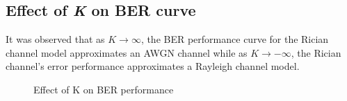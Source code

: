 \subsection{Effect of \emph{K} on BER curve}
It was observed that as \(K \to \infty\), the BER performance curve for the Rician channel model approximates an AWGN channel while as \(K \to -\infty\), the Rician channel's error performance approximates a Rayleigh channel model.
\begin{figure}[!h]
	\centerline{}
	\caption{Effect of K on BER performance}
	\label{res:fig:Kvariation}
\end{figure}

